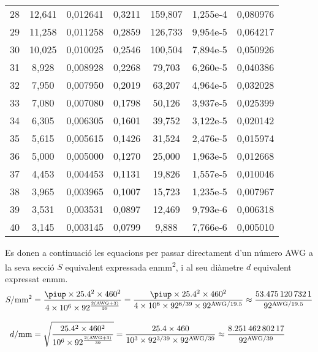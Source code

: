 \begin{longtable}{S[table-format=4.0]S[table-format=3.3]
                  S[table-format=2.6]S[table-format=2.4]
                  S[table-format=6.3]S[table-format=1.3e1]
                  S[table-format=3.6]}
28 &     12,641 &   0,012641 &     0,3211 &    159,807 &  1,255e-4 &   0,080976 \\
29 &     11,258 &   0,011258 &     0,2859 &    126,733 &  9,954e-5 &   0,064217 \\
30 &     10,025 &   0,010025 &     0,2546 &    100,504 &  7,894e-5 &   0,050926 \\
31 &      8,928 &   0,008928 &     0,2268 &     79,703 &  6,260e-5 &   0,040386 \\
32 &      7,950 &   0,007950 &     0,2019 &     63,207 &  4,964e-5 &   0,032028 \\
33 &      7,080 &   0,007080 &     0,1798 &     50,126 &  3,937e-5 &   0,025399 \\
34 &      6,305 &   0,006305 &     0,1601 &     39,752 &  3,122e-5 &   0,020142 \\
35 &      5,615 &   0,005615 &     0,1426 &     31,524 &  2,476e-5 &   0,015974 \\
36 &      5,000 &   0,005000 &     0,1270 &     25,000 &  1,963e-5 &   0,012668 \\
37 &      4,453 &   0,004453 &     0,1131 &     19,826 &  1,557e-5 &   0,010046 \\
38 &      3,965 &   0,003965 &     0,1007 &     15,723 &  1,235e-5 &   0,007967 \\
39 &      3,531 &   0,003531 &     0,0897 &     12,469 &  9,793e-6 &   0,006318 \\
40 &      3,145 &   0,003145 &     0,0799 &      9,888 &  7,766e-6 &   0,005010 \\
\bottomrule[1pt]
\end{longtable}

 Es donen a continuació les equacions per passar directament d'un número AWG a la seva secció $S$ equivalent expressada en\unit{mm^2}, i al seu diàmetre $d$ equivalent expressat en\unit{mm}.
\begin{align}
   S/\si{mm^2} &= \frac{ \piup \times \num{25,4}^2 \times 460^2}{4 \times 10^6 \times 92^{\frac{2(\text{AWG}+3)}{39}}} =
   \frac{ \piup \times \num{25,4}^2 \times 460^2}{4 \times 10^6 \times 92^{6/39} \times 92^{\text{AWG}/\num{19,5}}} \approx
   \frac{\num{53,4751207321}}{92^{\text{AWG}/\num{19,5}}}\label{eq:awg_mm2}\\[2ex]
   d/\si{mm} &= \sqrt{\frac{\num{25,4}^2 \times 460^2}{10^6 \times 92^{\frac{2(\text{AWG}+3)}{39}}}} =
   \frac{\num{25,4} \times 460}{10^3 \times 92^{3/39} \times 92^{\text{AWG}/39}} \approx
   \frac{\num{8,25146280217}}{92^{\text{AWG}/39}}\label{eq:awg_mm}
\end{align}

